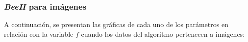 \subsubsection{\emph{BeeH} para imágenes}

	A continuación, se presentan las gráficas de cada uno de los
parámetros en relación con la variable $f$ cuando los datos
del algoritmo pertenecen a imágenes:

\begin{figure}[H]
  \centering
  \label{fig:f_bee1}
\end{figure}

